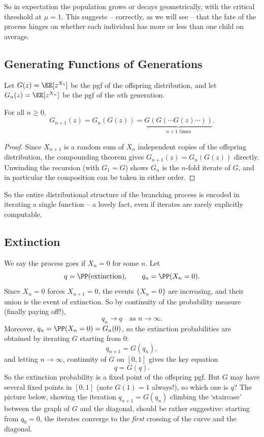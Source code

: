 So in expectation the population grows or decays geometrically, with the critical threshold at $\mu = 1$. This suggests -- correctly, as we will see -- that the fate of the process hinges on whether each individual has more or less than one child on average.

\subsection{Generating Functions of Generations}

Let $G(z) = \EE[z^{X_1}]$ be the pgf of the offspring distribution, and let $G_n(z) = \EE[z^{X_n}]$ be the pgf of the $n$th generation.

\begin{theorem}
	For all $n \geq 0$,
	$$
	G_{n + 1}(z) = G_n(G(z)) = \underbrace{G(G(\cdots G(z) \cdots))}_{n + 1 \text{ times}}.
	$$
\end{theorem}
\begin{proof}
	Since $X_{n+1}$ is a random sum of $X_n$ independent copies of the offspring distribution, the compounding theorem gives $G_{n + 1}(z) = G_n(G(z))$ directly. Unwinding the recursion (with $G_1 = G$) shows $G_n$ is the $n$-fold iterate of $G$, and in particular the composition can be taken in either order.
\end{proof}

So the entire distributional structure of the branching process is encoded in iterating a single function -- a lovely fact, even if iterates are rarely explicitly computable.

\subsection{Extinction}

We say the process goes  if $X_n = 0$ for some $n$. Let
$$
q = \PP(\text{extinction}), \qquad q_n = \PP(X_n = 0).
$$
Since $X_n = 0$ forces $X_{n+1} = 0$, the events $\{X_n = 0\}$ are increasing, and their union is the event of extinction. So by continuity of the probability measure (finally paying off!),
$$
q_n \longrightarrow q \quad \text{as } n \rightarrow \infty.
$$
Moreover, $q_n = \PP(X_n = 0) = G_n(0)$, so the extinction probabilities are obtained by iterating $G$ starting from $0$:
$$
q_{n + 1} = G(q_n),
$$
and letting $n \rightarrow \infty$, continuity of $G$ on $[0, 1]$ gives the key equation
$$
q = G(q).
$$
So the extinction probability is a fixed point of the offspring pgf. But $G$ may have several fixed points in $[0,1]$ (note $G(1) = 1$ always!), so which one is $q$? The picture below, showing the iteration $q_{n+1} = G(q_n)$ climbing the `staircase' between the graph of $G$ and the diagonal, should be rather suggestive: starting from $q_0 = 0$, the iterates converge to the \emph{first} crossing of the curve and the diagonal.

